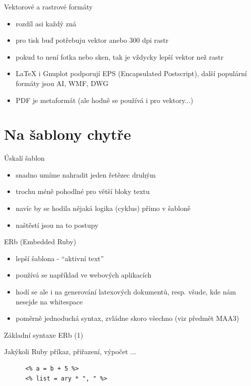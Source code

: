\documentclass{beamer}
\begin{document}
\begin{frame}{Vektorové a rastrové formáty}
  \begin{itemize}
    \item rozdíl asi každý zná
    \item pro tisk buď potřebuju vektor anebo 300 dpi rastr
    \item pokud to není fotka nebo sken, tak je vždycky lepší vektor než rastr
    \item LaTeX i Gnuplot podporují EPS (Encapsulated Postscript), další populární formáty jsou AI, WMF, DWG
    \item PDF je metaformát (ale hodně se používá i pro vektory...)
  \end{itemize}
\end{frame}

\section{Na šablony chytře}

\begin{frame}{Úskalí šablon}
  \begin{itemize}
    \item snadno umíme nahradit jeden řetězec druhým
    \item trochu méně pohodlné pro větší bloky textu
    \item navíc by se hodila nějaká logika (cyklus) přímo v šabloně
    \item naštěstí jsou na to postupy
  \end{itemize}
\end{frame}

\begin{frame}{ERb (Embedded Ruby)}
  \begin{itemize}
    \item lepší šablona - ``aktivní text''
    \item používá se například ve webových aplikacích
    \item hodí se ale i na generování latexových dokumentů, resp. všude, kde nám nesejde na whitespace
    \item poměrně jednoduchá syntax, zvládne skoro všechno (viz předmět MAA3)
  \end{itemize}
\end{frame}


\begin{frame}[fragile]{Základní syntaxe ERb (1)}
  \begin{block}{ }
    Jakýkoli Ruby příkaz, přiřazení, výpočet ...
    \scriptsize
    \begin{verbatim}
      <% a = b + 5 %>
      <% list = ary * ", " %>
    \end{verbatim}
  \end{block}
\end{frame}
\end{document}
